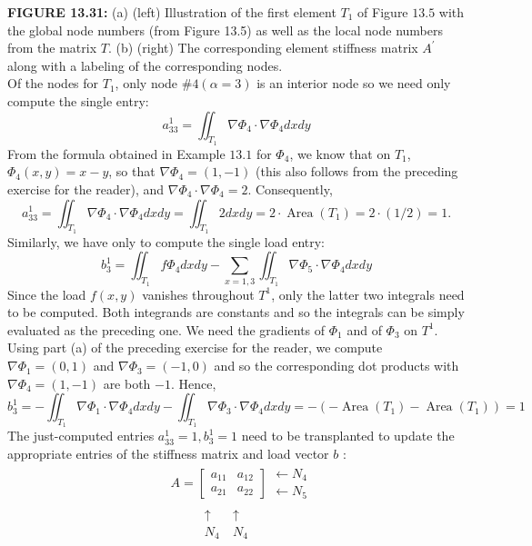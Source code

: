 \documentclass[../main.tex]{subfiles}
\begin{document}
\textbf{FIGURE 13.31:} (a) (left) Illustration of the first element $T_{1}$ of Figure $13.5$ with the global node numbers (from Figure 13.5) as well as the local node numbers from the matrix $T$. (b) (right) The corresponding element stiffness matrix $A^{\prime}$ along with a labeling of the corresponding nodes.
\\
Of the nodes for $T_{1}$, only node $\# 4(\alpha=3)$ is an interior node so we need only compute the single entry:
$$
a_{33}^{1}=\iint_{T_{1}} \nabla \Phi_{4} \cdot \nabla \Phi_{4} d x d y
$$
From the formula obtained in Example $13.1$ for $\Phi_{4}$, we know that on $T_{1}$, $\Phi_{4}(x, y)=x-y$, so that $\nabla \Phi_{4}=(1,-1)$ (this also follows from the preceding exercise for the reader), and $\nabla \Phi_{4} \cdot \nabla \Phi_{4}=2$. Consequently,
$$
a_{33}^{1}=\iint_{T_{1}} \nabla \Phi_{4} \cdot \nabla \Phi_{4} d x d y=\iint_{T_{1}} 2 d x d y=2 \cdot \operatorname{Area}\left(T_{1}\right)=2 \cdot(1 / 2)=1 .
$$
Similarly, we have only to compute the single load entry:
\\
$$
b_{3}^{1}=\iint_{T_{1}} f \Phi_{4} d x d y-\sum_{x=1,3} \iint_{T_{1}} \nabla \Phi_{5} \cdot \nabla \Phi_{4} d x d y
$$
Since the load $f(x, y)$ vanishes throughout $T^{1}$, only the latter two integrals need to be computed. Both integrands are constants and so the integrals can be simply evaluated as the preceding one. We need the gradients of $\Phi_{1}$ and of $\Phi_{3}$ on $T^{1}$. Using part (a) of the preceding exercise for the reader, we compute $\nabla \Phi_{1}=(0,1)$ and $\nabla \Phi_{3}=(-1,0)$ and so the corresponding dot products with $\nabla \Phi_{4}=(1,-1)$ are both $-1$. Hence,
$$
b_{3}^{1}=-\iint_{T_{1}} \nabla \Phi_{1} \cdot \nabla \Phi_{4} d x d y-\iint_{T_{1}} \nabla \Phi_{3} \cdot \nabla \Phi_{4} d x d y=-\left(-\operatorname{Area}\left(T_{1}\right)-\operatorname{Area}\left(T_{1}\right)\right)=1
$$
The just-computed entries $a_{33}^{1}=1, b_{3}^{1}=1$ need to be transplanted to update the appropriate entries of the stiffness matrix and load vector $b$ :
$$
\begin{aligned}
&A=\left[\begin{array}{ll}
a_{11} & a_{12}\\
a_{21}& a_{22}
\end{array}\right] \begin{array}{lll}
\leftarrow N_{4}\\
\leftarrow N_{5}
\end{array}
\\
&\begin{array}{cccc}
~&~&~\uparrow &~\uparrow\\
~&~&~N_{4}&~N_{4}
\end{array}
\end{aligned}
$$
\end{document}
